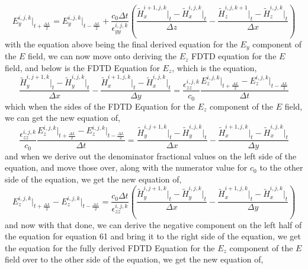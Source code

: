 \documentclass[]{article}
\begin{document}
\begin{equation}
{E}_{y}^{i,j,k}\Big|_{t+\frac{\Delta{L}}{2}} = E_{y}^{i,j,k}\Big|_{t - \frac{\Delta{L}}{2}} +  \frac{c_0\Delta{t}}{\epsilon_{yy}^{i,j,k}} \left(\frac{\tilde{H}_{x}^{i+1, j , k} \Big|_t - \tilde{H}_{x}^{i,j,k}\Big|_t}{\Delta{z}} - \frac{\tilde{H}_{z}^{i, j, k + 1} \Big|_t - \tilde{H}_{z}^{i,j,k}\Big|_t}{\Delta{x}}\right)
\end{equation}
with the equation above being the final derived equation for the $E_y$ component of the $E$ field, we can now move onto deriving the $E_z$ FDTD equation for the $E$ field, and below is the FDTD Equation for $E_z$, which is the equation,
\begin{equation}
\frac{\tilde{H}_{y}^{i, j + 1 , k} \Big|_t - \tilde{H}_{y}^{i,j,k}\Big|_t}{\Delta{x}} - \frac{\tilde{H}_{x}^{i + 1, j, k} \Big|_t - \tilde{H}_{x}^{i,j,k}\Big|_t}{\Delta{y}} = \frac{\epsilon_{zz}^{i,j,k}}{c_0} \frac{{E}_{z}^{i,j,k}\Big|_{t+\frac{\Delta{L}}{2}} -E_{z}^{i,j,k}\Big|_{t - \frac{\Delta{L}}{2}}}{\Delta{t}}
\end{equation}
which when the sides of the FDTD Equation for the $E_z$ component of the $E$ field, we can get the new equation of,
\begin{equation}
\frac{\epsilon_{zz}^{i,j,k}}{c_0} \frac{{E}_{z}^{i,j,k}\Big|_{t+\frac{\Delta{L}}{2}} -E_{z}^{i,j,k}\Big|_{t - \frac{\Delta{L}}{2}}}{\Delta{t}} = \frac{\tilde{H}_{y}^{i, j + 1 , k} \Big|_t - \tilde{H}_{y}^{i,j,k}\Big|_t}{\Delta{x}} - \frac{\tilde{H}_{x}^{i + 1, j, k} \Big|_t - \tilde{H}_{x}^{i,j,k}\Big|_t}{\Delta{y}}
\end{equation}
and when we derive out the denominator fractional values on the left side of the equation, and move those over, along with the numerator value for $c_0$ to the other side of the equation, we get the new equation of,
\begin{equation}
{E}_{z}^{i,j,k}\Big|_{t+\frac{\Delta{L}}{2}} -E_{z}^{i,j,k}\Big|_{t - \frac{\Delta{L}}{2}} = \frac{c_0\Delta{t}}{\epsilon_{zz}^{i,j,k}} \left(\frac{\tilde{H}_{y}^{i, j + 1 , k} \Big|_t - \tilde{H}_{y}^{i,j,k}\Big|_t}{\Delta{x}} - \frac{\tilde{H}_{x}^{i + 1, j, k} \Big|_t - \tilde{H}_{x}^{i,j,k}\Big|_t}{\Delta{y}}\right)
\end{equation}
and now with that done, we can derive the negative component on the left half of the equation for equation 61 and bring it to the right side of the equation, we get the equation for the fully derived FDTD Equation for the $E_z$ component of the $E$ field over to the other side of the equation, we get the new equation of,
\end{document}

